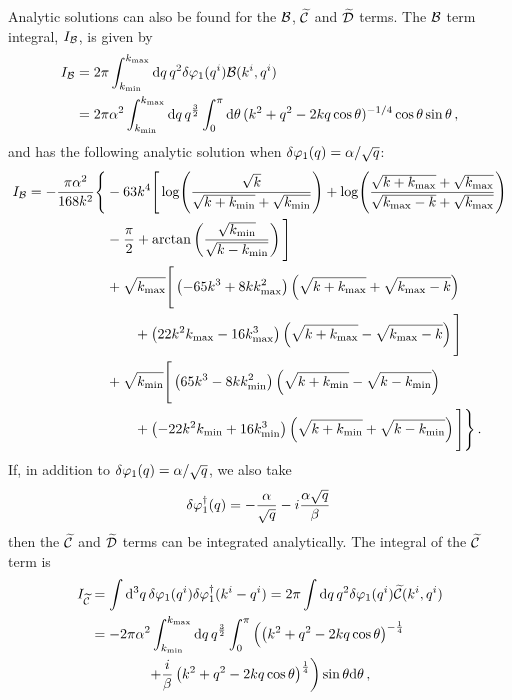 % 
% 
Analytic solutions can also be found for the $\mathcal{B}$, $\widetilde{\mathcal{C}}$ and $\widetilde{\mathcal{D}}$ terms.
The $\mathcal{B}$ term integral, $I_{\mathcal{B}}$, is given by
% 
\begin{align}
 \label{eq:bintegral-num}
I_\B &= 2\pi \int_{\kmin}^{\kmax} \d q\, q^2\dvp1(\qvi)\B(\kvi,\qvi) \nonumber\\
% 
     &= 2\pi\alpha^2 \int_{\kmin}^{\kmax} \d q\, q^{\frac{3}{2}}
\int_{0}^{\pi} \d\theta\, (k^2 + q^2 -2k q \cos{\theta})^{-1/4}
\cos{\theta}\sin{\theta}\,,
\end{align}
% 
and has the following analytic solution when $\delta\varphi_{1}(q) = \alpha/\sqrt{q}$:
% 
\begin{align}
\label{eq:intb-soln-num}
 I_\B = -\frac{\pi\alpha^2}{168 k^2}\Bigg\{ 
	&-63 k^4 \Bigg[ \log\Biggl(\frac{\sqrt{k}}{\sqrt{k+\kmin} + \sqrt{\kmin}}
			    \Biggr)
	 + \log\Biggl( \frac{\sqrt{k+\kmax} +\sqrt{\kmax}}{\sqrt{\kmax-k} +
		      \sqrt{\kmax}}\Biggr) \nonumber \\
	&-\frac{\pi}{2} + \arctan\left( \frac{\sqrt{\kmin}}{\sqrt{k-\kmin}}\right)
	\Bigg] \nonumber\\
% 
        &+\sqrt{\kmax}\Bigg[ \left(-65k^3 + 8k\kmax^2 \right)\left(\sqrt{k+\kmax} +
	  \sqrt{\kmax-k}\right) \nonumber \\
	&\qquad +\left(22k^2\kmax -16\kmax^3\right) \left(\sqrt{k+\kmax} -
         \sqrt{\kmax -k} \right) \Bigg] \nonumber \\
	&+\sqrt{\kmin}\Bigg[ \left(65k^3 - 8k\kmin^2 \right)\left(\sqrt{k+\kmin} -
	  \sqrt{k-\kmin}\right) \nonumber \\
	&\qquad +\left(-22k^2\kmin +16\kmin^3\right) \left(\sqrt{k+\kmin} +
         \sqrt{k-\kmin} \right) \Bigg] \Bigg\} \,.
\end{align}
% 
If, in addition to $\delta\varphi_{1}(q) = \alpha/\sqrt{q}$, we also take
% 
\begin{equation}
 \delta\varphi_{1}^{\dagger}(q) = -\frac{\alpha}{\sqrt{q}} -i\frac{\alpha\sqrt{q}}{\beta}\,
\end{equation}
% 
then the $\widetilde{\mathcal{C}}$ and $\widetilde{\mathcal{D}}$ terms can be integrated analytically.
The integral of the $\widetilde{\mathcal{C}}$ term is 
% 
\begin{align}
 \label{eq:cint-num}
I_{\wt{\C}} &= \int\d^3 q\, \dvp1(\qvi) \dN{\dvp1}(\kvi-\qvi) 
    = 2\pi \int \d q\, q^2 \dvp1(\qvi) \wt{\C}(\kvi, \qvi) \nonumber\\
% 
 &= -2\pi\alpha^2 \int_{\kmin}^{\kmax} \d q\, q^{\frac{3}{2}} \int_0^\pi 
     \left( \left(k^2 + q^2 -2kq \cos\theta\right)^{-\frac{1}{4}} \right.\nonumber \\
            &\qquad \qquad \left.+\frac{i}{\beta}\left(k^2 + q^2 -2kq
\cos\theta\right)^{\frac{1}{4}}
	\right) \sin\theta \d \theta\,,
\end{align}

